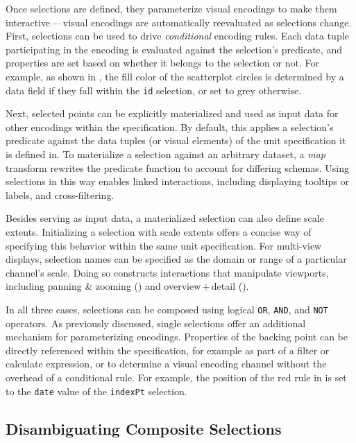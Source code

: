 Once selections are defined, they parameterize visual encodings to make them
interactive\,---\,visual encodings are automatically reevaluated as selections
change. First, selections can be used to drive \emph{conditional} encoding
rules. Each data tuple participating in the encoding is evaluated against the
selection's predicate, and properties are set based on whether it belongs to the
selection or not. For example, as shown in , the fill
color of the scatterplot circles is determined by a data field if they fall
within the \texttt{id} selection, or set to grey otherwise.

Next, selected points can be explicitly materialized and used as input data for
other encodings within the specification. By default, this applies a selection's
predicate against the data tuples (or visual elements) of the unit specification
it is defined in. To materialize a selection against an arbitrary dataset, a
\emph{map} transform rewrites the predicate function to account for differing
schemas. Using selections in this way enables linked interactions, including
displaying tooltips or labels, and cross-filtering.

Besides serving as input data, a materialized selection can also define scale
extents. Initializing a selection with scale extents offers a concise way of
specifying this behavior within the same unit specification. For multi-view
displays, selection names can be specified as the domain or range of a
particular channel's scale. Doing so constructs interactions that manipulate
viewports, including panning \& zooming () and
overview\,+\,detail ().

In all three cases, selections can be composed using logical \texttt{OR},
\texttt{AND}, and \texttt{NOT} operators. As previously discussed, single
selections offer an additional mechanism for parameterizing encodings.
Properties of the backing point can be directly referenced within  the
specification, for example as part of a filter or calculate expression, or to
determine a visual encoding channel without the overhead of a conditional rule.
For example, the position of the red rule in  is set to
the \texttt{date} value of the \texttt{indexPt} selection.

\subsection{Disambiguating Composite Selections}

